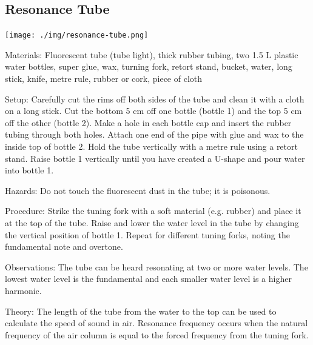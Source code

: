 \begin{multicols}{2}
\vfill
\columnbreak

\subsection{Resonance Tube}

\begin{center}
\texttt{[image: ./img/resonance-tube.png]}
\end{center}

\begin{description*}
\item[Materials:]{Fluorescent tube (tube light), thick rubber tubing, two 1.5 L plastic water bottles, super glue, wax, turning fork, retort stand, bucket, water, long stick, knife, metre rule, rubber or cork, piece of cloth}
\item[Setup:]{Carefully cut the rims off both sides of the tube and clean it with a cloth on a long stick. Cut the bottom 5 cm off one bottle (bottle 1) and the top 5 cm off the other (bottle 2). Make a hole in each bottle cap and insert the rubber tubing through both holes. Attach one end of the pipe with glue and wax to the inside top of bottle 2. Hold the tube vertically with a metre rule using a retort stand. Raise bottle 1 vertically until you have created a U-shape and pour water into bottle 1.}
\item[Hazards:]{Do not touch the fluorescent dust in the tube; it is poisonous.}
\item[Procedure:]{Strike the tuning fork with a soft material (e.g. rubber) and place it at the top of the tube. Raise and lower the water level in the tube by changing the vertical position of bottle 1. Repeat for different tuning forks, noting the fundamental note and overtone.}
\item[Observations:]{The tube can be heard resonating at two or more water levels. The lowest water level is the fundamental and each smaller water level is a higher harmonic.}
\item[Theory:]{The length of the tube from the water to the top can be used to calculate the speed of sound in air. Resonance frequency occurs when the natural frequency of the air column is equal to the forced frequency from the tuning fork.}
\end{description*}


\end{multicols}
